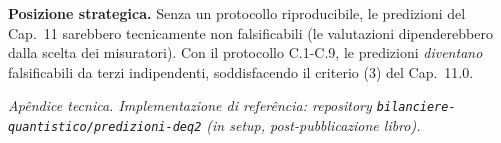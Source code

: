 \Hypoth{} \textbf{Posizione strategica.} Senza un protocollo
riproducibile, le predizioni del Cap.~11 sarebbero tecnicamente non
falsificabili (le valutazioni dipenderebbero dalla scelta dei
misuratori). Con il protocollo C.1-C.9, le predizioni \emph{diventano}
falsificabili da terzi indipendenti, soddisfacendo il criterio (3) del
Cap.~11.0.



\emph{Apêndice tecnica. Implementazione di referência: repository
\texttt{bilanciere-quantistico/predizioni-deq2} (in setup,
post-pubblicazione libro).}
